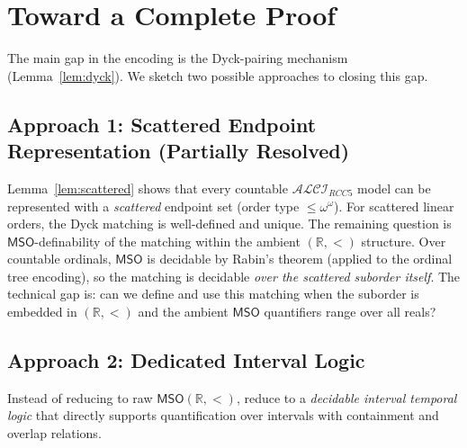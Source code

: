 \documentclass[a4paper,11pt]{article}
\theoremstyle{definition}
\newcommand{\ALCIRCC}[1]{\ensuremath{\mathcal{ALCI}_{\mathit{RCC#1}}}}
\newcommand{\MSO}{\ensuremath{\mathsf{MSO}}}
\newcommand{\reals}{\ensuremath{\mathbb{R}}}
\begin{document}
\section{Toward a Complete Proof}
\label{sec:toward}

The main gap in the encoding is the Dyck-pairing mechanism
(Lemma~\ref{lem:dyck}).  We sketch two possible approaches to
closing this gap.

\subsection{Approach 1: Scattered Endpoint Representation (Partially Resolved)}

Lemma~\ref{lem:scattered} shows that every countable $\ALCIRCC{5}$
model can be represented with a \emph{scattered} endpoint set (order
type $\leq \omega^\omega$).  For scattered linear orders, the Dyck
matching is well-defined and unique.  The remaining question is
$\MSO$-definability of the matching within the ambient
$(\reals, <)$ structure.  Over countable ordinals, $\MSO$ is
decidable by Rabin's theorem (applied to the ordinal tree encoding),
so the matching is decidable \emph{over the scattered suborder
itself}.  The technical gap is: can we define and use this matching
when the suborder is embedded in $(\reals, <)$ and the ambient
$\MSO$ quantifiers range over all reals?

\subsection{Approach 2: Dedicated Interval Logic}

Instead of reducing to raw $\MSO(\reals, <)$, reduce to a
\emph{decidable interval temporal logic} that directly supports
quantification over intervals with containment and overlap relations.
\end{document}
